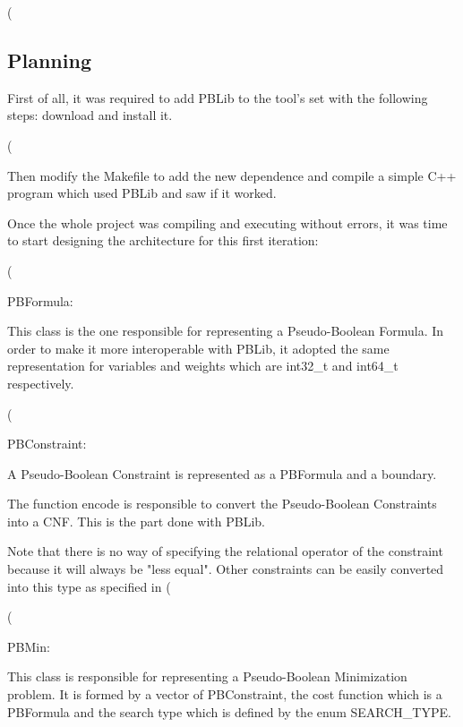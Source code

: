 (%


\subsection{Planning}

First of all, it was required to add PBLib to the tool's set with the following steps: download and install it.  

(%

Then modify the Makefile to add the new dependence and compile a simple C++ program which used PBLib and saw if it worked.  

Once the whole project was compiling and executing without errors, it was time to start designing the architecture for this first iteration: 



(%



PBFormula:  

This class is the one responsible for representing a Pseudo-Boolean Formula. In order to make it more interoperable with PBLib, it adopted the same representation for variables and weights which are int32\_t and int64\_t respectively.  

(%



PBConstraint: 

A Pseudo-Boolean Constraint is represented as a PBFormula and a boundary.  

The function encode is responsible to convert the Pseudo-Boolean Constraints into a CNF. This is the part done with PBLib. 

Note that there is no way of specifying the relational operator of the constraint because it will always be "less equal".  Other constraints can be easily converted into this type as specified in (%

(%



PBMin: 

This class is responsible for representing a Pseudo-Boolean Minimization problem.  It is formed by a vector of PBConstraint, the cost function which is a PBFormula and the search type which is defined by the enum SEARCH\_TYPE.  

